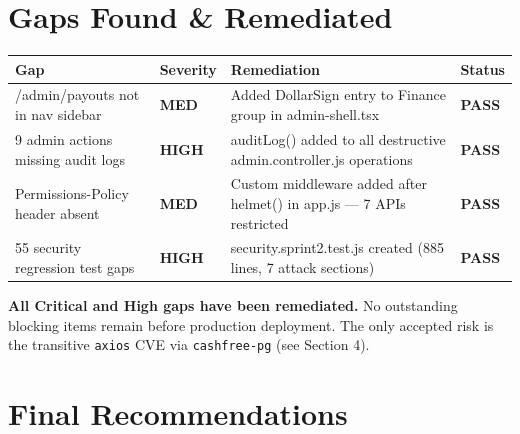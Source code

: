 \documentclass[11pt,a4paper]{article}
\newcommand{\PASS}{\colorbox{successgreen!20}{\color{successgreen}\bfseries\small PASS}}
\newcommand{\HIGH}{\colorbox{dangerred!20}{\color{dangerred}\bfseries\tiny HIGH}}
\newcommand{\MEDIUM}{\colorbox{warnyellow!20}{\color{warnyellow}\bfseries\tiny MED}}
\begin{document}
\section{Gaps Found \& Remediated}

\begin{tabularx}{\textwidth}{@{}p{4cm}p{2cm}Xp{2.5cm}@{}}
\toprule
\rowcolor{navyblue}
\color{white}\bfseries Gap & \color{white}\bfseries Severity & \color{white}\bfseries Remediation & \color{white}\bfseries Status \\
\midrule
/admin/payouts not in nav sidebar & \MEDIUM & Added DollarSign entry to Finance group in admin-shell.tsx & \PASS \\
\rowcolor{rowalt}
9 admin actions missing audit logs & \HIGH & auditLog() added to all destructive admin.controller.js operations & \PASS \\
Permissions-Policy header absent & \MEDIUM & Custom middleware added after helmet() in app.js — 7 APIs restricted & \PASS \\
\rowcolor{rowalt}
55 security regression test gaps & \HIGH & security.sprint2.test.js created (885 lines, 7 attack sections) & \PASS \\
\bottomrule
\end{tabularx}

\vspace{8pt}

\begin{successbox}
\textbf{All Critical and High gaps have been remediated.} No outstanding
blocking items remain before production deployment. The only accepted risk
is the transitive \texttt{axios} CVE via \texttt{cashfree-pg} (see Section 4).
\end{successbox}

\section{Final Recommendations}
\end{document}
